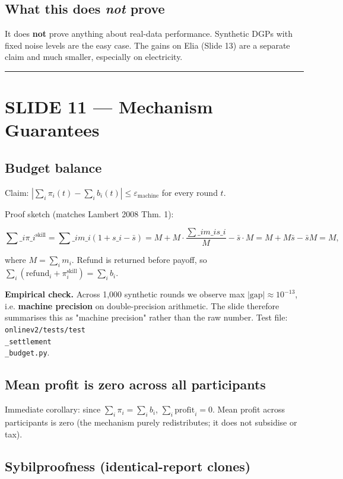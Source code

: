 \documentclass[11pt]{article}
\begin{document}
\subsection{What this does \emph{not} prove}


It does \textbf{not} prove anything about real-data performance. Synthetic DGPs with fixed noise levels are the easy case. The gains on Elia (Slide 13) are a separate claim and much smaller, especially on electricity.

\bigskip\hrule\bigskip

\section{SLIDE 11 --- Mechanism Guarantees}


\subsection{Budget balance}


Claim: $\left|\sum_i \pi_i(t) - \sum_i b_i(t)\right| \le \varepsilon_{\text{machine}}$ for every round $t$.

Proof sketch (matches Lambert 2008 Thm. 1):

$$
\sum\_i \pi\_i^{\text{skill}} = \sum\_i m\_i(1 + s\_i - \bar s) = M + M \cdot \frac{\sum\_i m\_i s\_i}{M} - \bar s \cdot M = M + M \bar s - \bar s M = M,
$$

where $M = \sum_i m_i$. Refund is returned before payoff, so $\sum_i (\text{refund}_i + \pi_i^{\text{skill}}) = \sum_i b_i$.

\textbf{Empirical check.} Across 1{,}000 synthetic rounds we observe max $|\text{gap}| \approx 10^{-13}$, i.e. \textbf{machine precision} on double-precision arithmetic. The slide therefore summarises this as "machine precision" rather than the raw number. Test file: \texttt{onlinev2/tests/test\\_settlement\\_budget.py}.

\subsection{Mean profit is zero across all participants}


Immediate corollary: since $\sum_i \pi_i = \sum_i b_i$, $\sum_i \text{profit}_i = 0$. Mean profit across participants is zero (the mechanism purely redistributes; it does not subsidise or tax).

\subsection{Sybilproofness (identical-report clones)}
\end{document}
